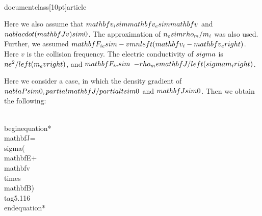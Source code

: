 \\documentclass[10pt]{article}
\begin{document}
{{{{Here we also assume that $\\mathbf{v}_{i} \\sim \\mathbf{v}_{e} \\sim \\mathbf{v}$ and $\\nabla \\cdot(\\mathbf{J v}) \\sim 0$. The approximation of $n_{e} \\sim \\rho_{m} / m_{i}$ was also used. Further, we assumed $\\mathbf{F}_{i e} \\sim-v m n\\left(\\mathbf{v}_{i}-\\mathbf{v}_{e}\\right)$. Here $v$ is the collision frequency. The electric conductivity of $\\sigma$ is $n e^{2} /\\left(m_{e} v\\right)$, and $\\mathbf{F}_{i e} \\sim$ $-\\rho_{m} e \\mathbf{J} /\\left(\\sigma m_{i}\\right)$.

Here we consider a case, in which the density gradient of $\\nabla P \\sim 0, \\partial \\mathbf{J} / \\partial t \\sim 0$ and $\\mathbf{J} \\sim 0$. Then we obtain the following:


\\begin{equation*}
\\mathbf{J}=\\sigma(\\mathbf{E}+\\mathbf{v} \\times \\mathbf{B}) \\tag{5.116}
\\end{equation*}


}}}}
\end{document}
